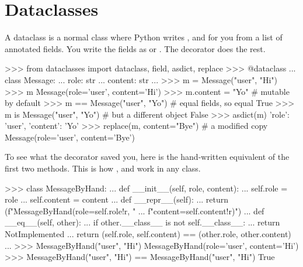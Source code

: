 \section{Dataclasses}

A dataclass is a normal class where Python writes ,  and
 for you from a list of annotated fields. You write the fields as
 or . The decorator does the rest.

\begin{center}
\end{center}

\begin{pycode}
>>> from dataclasses import dataclass, field, asdict, replace
>>> @dataclass
... class Message:
...     role: str
...     content: str
...
>>> m = Message("user", "Hi")
>>> m
Message(role='user', content='Hi')
>>> m.content = "Yo"                       # mutable by default
>>> m == Message("user", "Yo")             # equal fields, so equal
True
>>> m is Message("user", "Yo")             # but a different object
False
>>> asdict(m)
{'role': 'user', 'content': 'Yo'}
>>> replace(m, content="Bye")              # a modified copy
Message(role='user', content='Bye')
\end{pycode}

To see what the decorator saved you, here is the hand-written equivalent of the first two
methods. This is how ,  and  work in any class.

\begin{pycode}
>>> class MessageByHand:
...     def __init__(self, role, content):
...         self.role = role
...         self.content = content
...     def __repr__(self):
...         return (f"MessageByHand(role={self.role!r}, "
...                 f"content={self.content!r})")
...     def __eq__(self, other):
...         if other.__class__ is not self.__class__:
...             return NotImplemented
...         return (self.role, self.content) == (other.role, other.content)
...
>>> MessageByHand("user", "Hi")
MessageByHand(role='user', content='Hi')
>>> MessageByHand("user", "Hi") == MessageByHand("user", "Hi")
True
\end{pycode}

